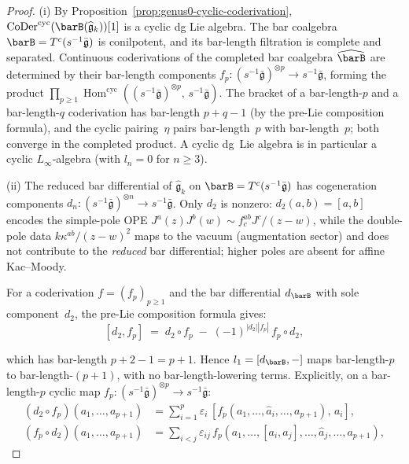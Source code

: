 \begin{proof}
(i)\enspace
By Proposition~\ref{prop:genus0-cyclic-coderivation},
$\operatorname{CoDer}^{\mathrm{cyc}}(\barB(\widehat{\mathfrak{g}}_k))[1]$
is a cyclic dg Lie algebra.
The bar coalgebra $\barB = T^c(s^{-1}\bar{\mathfrak{g}})$ is
conilpotent, and its bar-length filtration is complete and separated.
Continuous coderivations of the completed bar coalgebra
$\widehat{\barB}$ are determined by their bar-length components
$f_p\colon (s^{-1}\bar{\mathfrak{g}})^{\otimes p}
\to s^{-1}\bar{\mathfrak{g}}$, forming the product
$\prod_{p \geq 1}
\operatorname{Hom}^{\mathrm{cyc}}
((s^{-1}\bar{\mathfrak{g}})^{\otimes p},\,
s^{-1}\bar{\mathfrak{g}})$.
The bracket of a bar-length-$p$ and a bar-length-$q$ coderivation
has bar-length $p + q - 1$ (by the pre-Lie composition formula),
and the cyclic pairing~$\eta$ pairs bar-length~$p$ with
bar-length~$p$; both converge in the completed product.
A cyclic dg~Lie algebra is in particular a cyclic
$L_\infty$-algebra (with $l_n = 0$ for $n \geq 3$).

(ii)\enspace
The reduced bar differential of $\widehat{\mathfrak{g}}_k$ on
$\barB = T^c(s^{-1}\bar{\mathfrak{g}})$ has cogeneration components
$d_n\colon (s^{-1}\bar{\mathfrak{g}})^{\otimes n}
\to s^{-1}\bar{\mathfrak{g}}$.
Only $d_2$ is nonzero: $d_2(a,b) = [a,b]$ encodes the simple-pole
OPE $J^a(z)J^b(w) \sim f^{ab}_c J^c/(z{-}w)$, while the double-pole
data $k\kappa^{ab}/(z{-}w)^2$ maps to the vacuum (augmentation
sector) and does not contribute to the \emph{reduced} bar
differential; higher poles are absent for affine Kac--Moody.

For a coderivation $f = (f_p)_{p \geq 1}$ and the bar differential
$d_{\barB}$ with sole component~$d_2$, the pre-Lie composition
formula gives:
\[
[d_2, f_p]
\;=\; d_2 \circ f_p \;-\; (-1)^{|d_2||f_p|}\, f_p \circ d_2,
\]

which has bar-length $p + 2 - 1 = p + 1$. Hence $l_1 = [d_{\barB},-]$
maps bar-length-$p$ to bar-length-$(p{+}1)$, with no bar-length-lowering
terms. Explicitly, on a bar-length-$p$ cyclic map
$f_p\colon (s^{-1}\bar{\mathfrak{g}})^{\otimes p}
\to s^{-1}\bar{\mathfrak{g}}$:
\begin{align*}
(d_2 \circ f_p)(a_1, \ldots, a_{p+1})
&= \sum_{i=1}^{p} \varepsilon_i\,
 [f_p(a_1, \ldots, \widehat{a}_i, \ldots, a_{p+1}),\, a_i], \\
(f_p \circ d_2)(a_1, \ldots, a_{p+1})
&= \sum_{i < j} \varepsilon_{ij}\,
 f_p(a_1, \ldots, [a_i, a_j], \ldots, \widehat{a}_j,
 \ldots, a_{p+1}),
\end{align*}


\end{proof}
